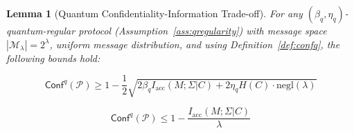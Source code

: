 \documentclass{ieeeaccess}
\newcommand{\Conf}{\mathsf{Conf}}
\newtheorem{lemma}{Lemma}[section]
\begin{document}
\begin{lemma}[Quantum Confidentiality-Information Trade-off]
\label{lem:q_conf_mi}
For any $(\beta_q, \eta_q)$-quantum-regular protocol (Assumption~\ref{ass:qregularity}) with message space $|\mathcal{M}_\lambda| = 2^\lambda$, uniform message distribution, and using Definition~\ref{def:confq}, the following bounds hold:

\begin{equation}
\label{eq:conf_lower}
    \Conf^q(\mathcal{P}) \geq 1 - \frac{1}{2}\sqrt{2\beta_q I_{\mathrm{acc}}(M;\Sigma|C) + 2\eta_q H(C) \cdot \mathrm{negl}(\lambda)}
\end{equation}

\begin{equation}
\label{eq:conf_upper}
    \Conf^q(\mathcal{P}) \leq 1 - \frac{I_{\mathrm{acc}}(M;\Sigma|C)}{\lambda}
\end{equation}
\end{lemma}
\end{document}
